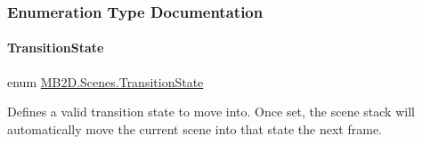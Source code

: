 \subsubsection{Enumeration Type Documentation}
\hypertarget{namespace_m_b2_d_1_1_scenes_a0e0db3f97bbaa272f70534c5954c4acc}{}\label{namespace_m_b2_d_1_1_scenes_a0e0db3f97bbaa272f70534c5954c4acc} 
\paragraph{\texorpdfstring{Transition\+State}{TransitionState}}
{\footnotesize\ttfamily enum \hyperlink{namespace_m_b2_d_1_1_scenes_a0e0db3f97bbaa272f70534c5954c4acc}{M\+B2\+D.\+Scenes.\+Transition\+State}\hspace{0.3cm}{\ttfamily [strong]}}



Defines a valid transition state to move into. Once set, the scene stack will automatically move the current scene into that state the next frame. 

